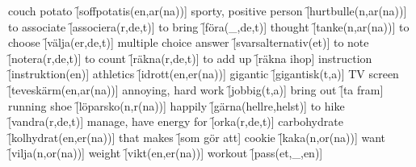 \begin{questions}
    \begin{multicols}{2}
        \raggedcolumns
        \question couch potato \f[soffpotatis(en,ar(na))]
        \question sporty, positive person \f[hurtbulle(n,ar(na))]
        \question to associate \f[associera(r,de,t)]
        \question to bring \f[föra(\_,de,t)]
        \question thought \f[tanke(n,ar(na))]
        \question to choose \f[välja(er,de,t)]
        \question multiple choice answer \f[svarsalternativ(et)]
        \question to note \f[notera(r,de,t)]
        \question to count \f[räkna(r,de,t)]
        \question to add up \f[räkna ihop]
        \question instruction \f[instruktion(en)]
        \question athletics \f[idrott(en,er(na))]
        \question gigantic \f[gigantisk(t,a)]
        \question TV screen \f[teveskärm(en,ar(na))]
        \question annoying, hard work \f[jobbig(t,a)]
        \question bring out \f[ta fram]
        \question running shoe \f[löparsko(n,r(na))]
        \question happily \f[gärna(hellre,helst)]
        \question to hike \f[vandra(r,de,t)]
        \question manage, have energy for \f[orka(r,de,t)]
        \question carbohydrate \f[kolhydrat(en,er(na))]
        \question that makes \f[som gör att]
        \question cookie \f[kaka(n,or(na))]
        \question want \f[vilja(n,or(na))]
        \question weight \f[vikt(en,er(na))]
        \question workout \f[pass(et,\_,en)]
    \end{multicols}
\end{questions}
